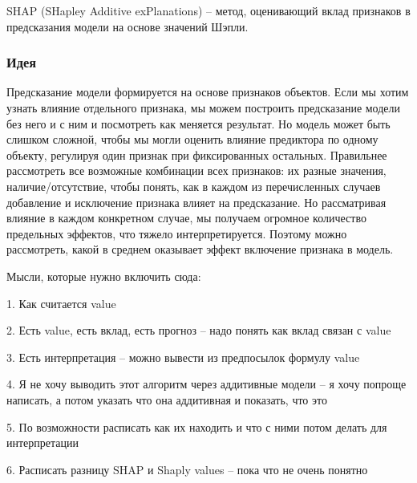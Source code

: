 SHAP (SHapley Additive exPlanations) -- метод, оценивающий вклад признаков в предсказания модели на основе значений Шэпли.

\subsubsection{Идея}
Предсказание модели формируется на основе признаков объектов. Если мы хотим узнать влияние отдельного признака, мы можем построить предсказание модели без него и с ним и посмотреть как меняется результат. %
Но модель может быть слишком сложной, чтобы мы могли оценить влияние предиктора по одному объекту, регулируя один признак при фиксированных остальных. %
Правильнее рассмотреть все возможные комбинации всех признаков: их разные значения, наличие/отсутствие, чтобы понять, как в каждом из перечисленных случаев добавление и исключение признака влияет на предсказание. Но рассматривая влияние в каждом конкретном случае, мы получаем огромное количество предельных эффектов, что тяжело интерпретируется. Поэтому можно рассмотреть, какой в среднем оказывает эффект включение признака в модель.

Мысли, которые нужно включить сюда:

1. Как считается value

2. Есть value, есть вклад, есть прогноз -- надо понять как вклад связан с value

3. Есть интерпретация -- можно вывести из предпосылок формулу value

4. Я не хочу выводить этот алгоритм через аддитивные модели -- я хочу попроще написать, а потом указать что она аддитивная и показать, что это

5. По возможности расписать как их находить и что с ними потом делать для интерпретации

6. Расписать разницу SHAP и Shaply values -- пока что не очень понятно
